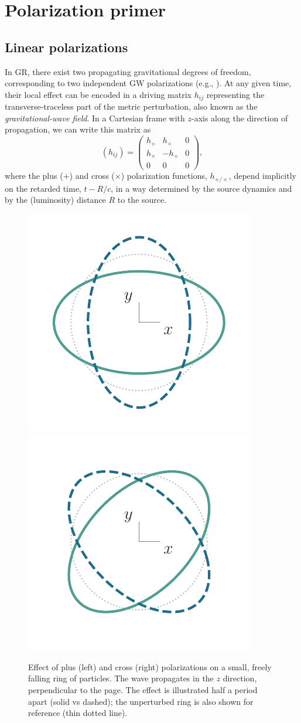 \documentclass[aps,prd,twocolumn,superscriptaddress,preprintnumbers,floatfix,nofootinbib]{revtex4-2}
\newcommand{\beq}{\begin{equation}}
\newcommand{\eeq}{\end{equation}}
\begin{document}
\section{Polarization primer}

\subsection{Linear polarizations}

In GR, there exist two propagating gravitational degrees of freedom, corresponding to two independent GW polarizations (e.g., \cite{Thorne1983,Thorne:1987af,Poisson2014,BT}).
At any given time, their local effect can be encoded in a driving matrix $h_{ij}$ representing the transverse-traceless part of the metric perturbation, also known as the \emph{gravitational-wave field}.
In a Cartesian frame with $z$-axis along the direction of propagation, we can write this matrix as
\beq \label{eq:hij}
(h_{ij}) = \begin{pmatrix}
h_+ & h_\times  & 0 \\
h_\times  & - h_+ & 0  \\
0 & 0 & 0
\end{pmatrix} ,
\eeq
where the plus ($+$) and cross ($\times$) polarization functions, $h_{+/\times}$, depend implicitly on the retarded time, $t - R/c$, in a way determined by the source dynamics and by the (luminosity) distance $R$ to the source.

\begin{figure}
\includegraphics[width=0.4\columnwidth]{pol_ring_plus}
\includegraphics[width=0.4\columnwidth]{pol_ring_cross}
\caption{Effect of plus (left) and cross (right) polarizations on a small, freely falling ring of particles. The wave propagates in the $z$ direction, perpendicular to the page. The effect is illustrated half a period apart (solid vs dashed); the unperturbed ring is also shown for reference (thin dotted line).
}
\label{fig:rings}
\end{figure}
\end{document}
